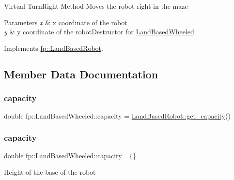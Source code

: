 Virtual Turn\+Right Method Moves the robot right in the maze 
\begin{DoxyParams}{Parameters}
{\em x} & x coordinate of the robot \\
\hline
{\em y} & y coordinate of the robot\+Destructor for \hyperlink{classfp_1_1_land_based_wheeled}{Land\+Based\+Wheeled} \\
\hline
\end{DoxyParams}


Implements \hyperlink{classfp_1_1_land_based_robot_a7360e4084bc5254f72ab0d3612644907}{fp\+::\+Land\+Based\+Robot}.



\subsection{Member Data Documentation}
\mbox{\label{classfp_1_1_land_based_wheeled_a724d9e2b23926f461d8afea8311707e3}} 
\subsubsection{\texorpdfstring{capacity}{capacity}}
{\footnotesize\ttfamily double fp\+::\+Land\+Based\+Wheeled\+::capacity = \hyperlink{classfp_1_1_land_based_robot_a24c0f6d395f3dfd6bdbcf5a2a9801de1}{Land\+Based\+Robot\+::get\+\_\+capacity}()}

\mbox{\label{classfp_1_1_land_based_wheeled_abf13221333a556a215b951d45568f03a}} 
\subsubsection{\texorpdfstring{capacity\+\_\+}{capacity\_}}
{\footnotesize\ttfamily double fp\+::\+Land\+Based\+Wheeled\+::capacity\+\_\+ \{\}\hspace{0.3cm}{\ttfamily [protected]}}

Height of the base of the robot \mbox{\label{classfp_1_1_land_based_wheeled_a71bec8ed4710864eb7a9534b3d39e060}} 
